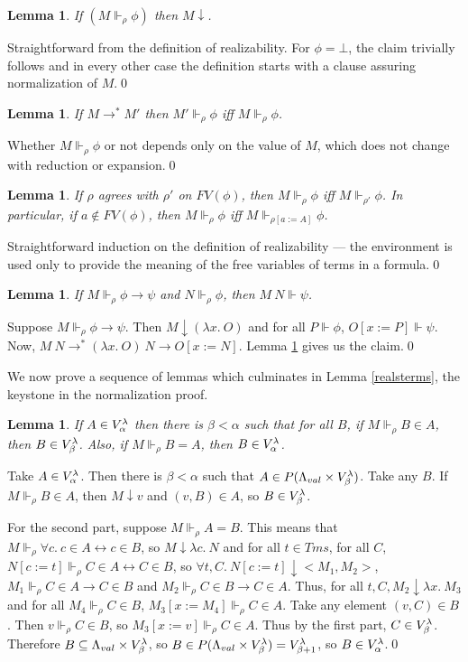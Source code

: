 \documentclass{LMCS}
\newtheorem{lemma}[thm]{Lemma}
\newcommand\iffl{\ensuremath{\leftrightarrow}}
\newcommand\reals{\ensuremath{\Vdash}}
\newcommand{\rrho}{\reals_\rho}
\begin{document}
\begin{lemma}\label{realnorm}
If $(M \rrho \phi)$ then $M \downarrow$.
\end{lemma}
\proof Straightforward from the definition of realizability. For $\phi = \bot$,
the claim trivially follows and in every other case the definition starts with a clause assuring normalization of $M$.\qed

\begin{lemma}\label{realredclosed}
If $M \to^* M'$ then $M'\reals_\rho \phi$ iff $M \reals_\rho \phi$.
\end{lemma}
\proof Whether $M \rrho \phi$ or not depends only on the value of $M$, which does not
change with reduction or expansion.\qed


\begin{lemma}\label{afvreal}
If $\rho$ agrees with $\rho'$ on $FV(\phi)$, then $M \rrho \phi$ iff $M
\reals_{\rho'} \phi$. In particular, if $a \notin FV(\phi)$, then $M \rrho
\phi$ iff $M \reals_{\rho[a:=A]} \phi$. 
\end{lemma}
\proof Straightforward induction on the definition of realizability --- the environment
is used only to provide the meaning of the free variables of terms in a
formula.\qed


\begin{lemma}\label{realimpl}
If $M \reals_\rho \phi \to \psi$ and $N \reals_\rho \phi$, then $M\ N \reals
\psi$. 
\end{lemma}
\proof Suppose $M \reals_\rho \phi \to \psi$. Then $M \downarrow (\lambda x.\ O)$
and for all $P \reals \phi$, $O[x:=P] \reals \psi$. Now, $M\ N \to^*
(\lambda x.\ O)\ N \to O[x:=N]$. Lemma \ref{realredclosed} gives us the claim.\qed


We now prove a sequence of lemmas which culminates in Lemma
\ref{realsterms}, the keystone in the normalization proof. 

\begin{lemma}\label{ineqrank}
If $A \in V^{\lambda}_\alpha$ then there is $\beta \lt \alpha$ such that
for all $B$, if $M \reals_\rho B \in A$, then $B \in V^{\lambda}_\beta$. Also, if $M
\reals_\rho B = A$, then $B \in V^{\lambda}_\alpha$.
\end{lemma}
\proof Take $A \in V^{\lambda}_\alpha$. Then there is $\beta \lt \alpha$ such that $A \in P(\Lambda_{val} \times
V^{\lambda}_\beta)$. Take any $B$. If $M \rrho B \in A$, then $M \downarrow v$ and $(v, B) \in A$, so $B \in V^{\lambda}_\beta$.

For the second part, suppose $M \reals_\rho A = B$. 
This means that $M \reals_\rho \forall c.\ c \in A \iffl c \in B$, so $M
\downarrow \lambda c.\ N$ and for all $t \in Tms$, for all $C$, $N[c:=t]
\rrho C \in A \iffl C \in B$, so $\forall t, C.\ N[c:=t] \downarrow
<M_1, M_2>$, $M_1 \rrho C \in A \to C \in B$ and $M_2
\rrho C \in B \to C \in A$. Thus, for all $t, C, M_2 \downarrow \lambda x.\ M_3$ and for
all $M_4 \rrho C \in B$, $M_3[x:=M_4] \rrho C \in A$. Take any element $(v, C) \in B$. Then $v
\rrho C \in B$, so $M_3[x:=v] \rrho C \in A$. Thus by the first part, $C \in V^{\lambda}_\beta$. 
Therefore $B \subseteq \Lambda_{val} \times V^{\lambda}_\beta$, so $B \in P(\Lambda_{val} \times V^{\lambda}_\beta) =
V^{\lambda}_{\beta + 1}$, so $B \in V^{\lambda}_\alpha$.\qed
\end{document}
